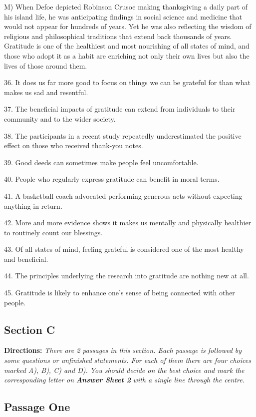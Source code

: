\documentclass[UTF8,11pt]{ctexart}
\begin{document}
M) When Defoe depicted Robinson Crusoe making thanksgiving a daily part of his island life, he was anticipating findings in social science and medicine that would not appear for hundreds of years. Yet he was also reflecting the wisdom of religious and philosophical traditions that extend back thousands of years. Gratitude is one of the healthiest and most nourishing of all states of mind, and those who adopt it as a habit are enriching not only their own lives but also the lives of those around them.


36. It does us far more good to focus on things we can be grateful for than what makes us sad and resentful.


37. The beneficial impacts of gratitude can extend from individuals to their community and to the wider society.


38. The participants in a recent study repeatedly underestimated the positive effect on those who received thank-you notes.


39. Good deeds can sometimes make people feel uncomfortable.


40. People who regularly express gratitude can benefit in moral terms.


41. A basketball coach advocated performing generous acts without expecting anything in return.


42. More and more evidence shows it makes us mentally and physically healthier to routinely count our blessings.


43. Of all states of mind, feeling grateful is considered one of the most healthy and beneficial.


44. The principles underlying the research into gratitude are nothing new at all.


45. Gratitude is likely to enhance one’s sense of being connected with other people.


\subsection*{\textbf{Section C}}


\textbf{Directions: }\textit{There are 2 passages in this section. Each passage is followed by some questions or unfinished} \textit{statements. For each of them there are four choices marked A), B), C) and D). You should decide on the best} \textit{choice and mark the corresponding letter on }\textbf{\textit{Answer Sheet 2}}\textit{ with a single line through the centre.}


\subsection*{\textbf{Passage One}}
\end{document}
